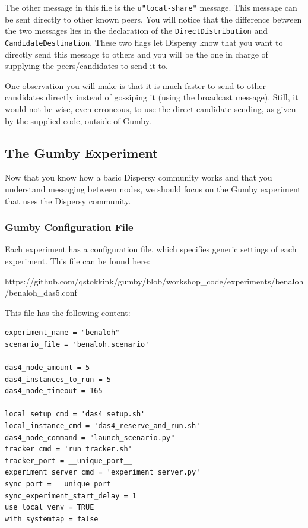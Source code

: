 \documentclass{article}
\begin{document}
The other message in this file is the \texttt{u"local-share"} message.
This message can be sent directly to other known peers.
You will notice that the difference between the two messages lies in the declaration of the \texttt{DirectDistribution} and \texttt{CandidateDestination}.
These two flags let Dispersy know that you want to directly send this message to others and you will be the one in charge of supplying the peers/candidates to send it to.

One observation you will make is that it is much faster to send to other candidates directly instead of gossiping it (using the broadcast message).
Still, it would not be wise, even erroneous, to use the direct candidate sending, as given by the supplied code, outside of Gumby.

\subsection{The Gumby Experiment}
Now that you know how a basic Dispersy community works and that you understand messaging between nodes, we should focus on the Gumby experiment that uses the Dispersy community.

\subsubsection{Gumby Configuration File}
Each experiment has a configuration file, which specifies generic settings of each experiment.
This file can be found here:

https://github.com/qstokkink/gumby/blob/workshop\_code/experiments/benaloh/benaloh\_das5.conf

This file has the following content:

\begin{lstlisting}[frame=single]
experiment_name = "benaloh"
scenario_file = 'benaloh.scenario'

das4_node_amount = 5
das4_instances_to_run = 5
das4_node_timeout = 165

local_setup_cmd = 'das4_setup.sh'
local_instance_cmd = 'das4_reserve_and_run.sh'
das4_node_command = "launch_scenario.py"
tracker_cmd = 'run_tracker.sh'
tracker_port = __unique_port__
experiment_server_cmd = 'experiment_server.py'
sync_port = __unique_port__
sync_experiment_start_delay = 1
use_local_venv = TRUE
with_systemtap = false
\end{lstlisting}
\end{document}
